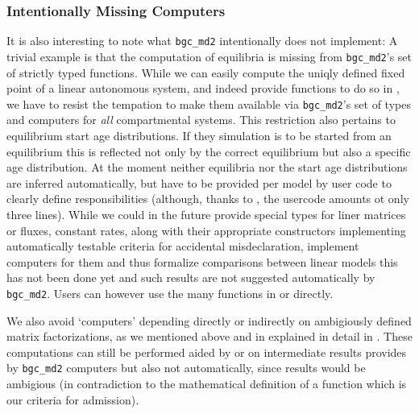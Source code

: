 \subsubsection{Intentionally Missing Computers}
It is also interesting to note what \texttt{bgc\_md2} intentionally does not implement:
A trivial example is that the computation of equilibria is missing from \texttt{bgc\_md2}'s set of strictly typed functions. 
While we can easily compute the uniqly defined fixed point of a linear
autonomous system, and indeed provide functions to do so in \LAPM, we have to
resist the tempation to make them available via \texttt{bgc\_md2}'s set of
types and computers for \emph{all} compartmental systems. 
This restriction also pertains to equilibrium start age distributions. 
If they simulation is to be started from an equilibrium this is reflected not only by the correct equilibrium
but also a specific age distribution.  
At the moment neither equilibria nor the start age distributions 
are inferred automatically, but have to be provided per model by 
user code to clearly define responsibilities (although, thanks to \LAPM, the usercode amounts ot only three lines).
While we could in the future provide special types for liner matrices or
fluxes, constant rates, along with their appropriate constructors implementing
automatically testable criteria for accidental misdeclaration, implement
computers for them and thus formalize comparisons between linear models
this has not been done yet and such results are not suggested automatically by \texttt{bgc\_md2}.
Users can however use the many functions in \LAPM or \CompartmentalSystems directly.

We also avoid `computers' depending directly or indirectly on ambigiously defined matrix factorizations, 
as we mentioned above and in explained in detail in . 
These computations can still be performed aided by  \LAPM or \CompartmentalSystems on intermediate results
provides by \texttt{bgc\_md2} computers but also not automatically, since results would be ambigious (in contradiction to the mathematical definition of a function which is our criteria  for admission). 


